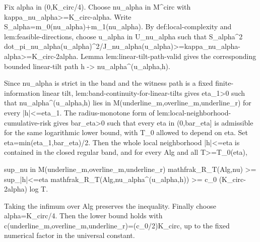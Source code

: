 \documentclass{article}
\begin{document}
Fix alpha in (0,K_circ/4). Choose nu_alpha in M^circ with kappa_{nu_alpha}>=K_circ-alpha. Write S_alpha=m_0(nu_alpha)+m_1(nu_alpha). By def:local-complexity and lem:feasible-directions, choose u_alpha in U_{nu_alpha} such that S_alpha^2 dot_pi_{nu_alpha}(u_alpha)^2/J_{nu_alpha}(u_alpha)>=kappa_{nu_alpha}-alpha>=K_circ-2alpha. Lemma lem:linear-tilt-path-valid gives the corresponding bounded linear-tilt path h -> nu_alpha^(u_alpha,h).

Since nu_alpha is strict in the band and the witness path is a fixed finite-information linear tilt, lem:band-continuity-for-linear-tilts gives eta_1>0 such that nu_alpha^(u_alpha,h) lies in M(underline_m,overline_m,underline_r) for every |h|<=eta_1. The radius-monotone form of lem:local-neighborhood-cumulative-risk gives bar_eta>0 such that every eta in (0,bar_eta] is admissible for the same logarithmic lower bound, with T_0 allowed to depend on eta. Set eta=min(eta_1,bar_eta)/2. Then the whole local neighborhood {|h|<=eta} is contained in the closed regular band, and for every Alg and all T>=T_0(eta),

sup_{nu in M(underline_m,overline_m,underline_r)} mathfrak_R_T(Alg,nu) >= sup_{|h|<=eta} mathfrak_R_T(Alg,nu_alpha^(u_alpha,h)) >= c_0 (K_circ-2alpha) log T.

Taking the infimum over Alg preserves the inequality. Finally choose alpha=K_circ/4. Then the lower bound holds with c(underline_m,overline_m,underline_r)=(c_0/2)K_circ, up to the fixed numerical factor in the universal constant.
\end{document}
